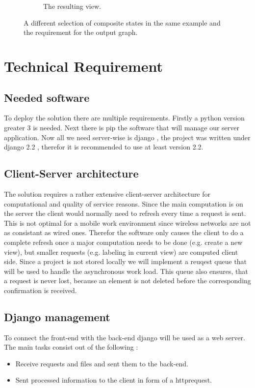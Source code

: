 \documentclass[12pt]{extarticle}
\begin{document}
\begin{figure}[H]
\begin{subfigure}[b]{0.45\textwidth}
        \caption{The resulting view.}
        \label{fig:view2}
    \end{subfigure}
    \caption{A different selection of composite states in the same example and the requirement for the output graph.}
    \label{fig:pandv}
\end{figure}

\section{Technical Requirement}

\subsection{Needed software}
To deploy the solution there are multiple requirements. Firstly a python version greater 3 is needed. Next there is pip the software that will manage our server application. Now all we need server-wise is django , the project was written under django 2.2 , therefor it is recommended to use at least version 2.2.

\subsection{Client-Server architecture}
The solution requires a rather extensive client-server architecture for computational and quality of service reasons. Since the main computation is on the server the client would normally need to refresh every time a request is sent. This is not optimal for a mobile work environment since wireless networks are not as consistant as wired ones. Therefor the software only causes the client to do a complete refresh once a major computation needs to be done (e.g. create a new view), but smaller requests (e.g. labeling in current view) are computed client side. Since a project is not stored locally we will implement a reuqest queue that will be used to handle the asynchronous work load. This queue also ensures, that a request is never lost, because an element is not deleted before the corresponding confirmation is received. 

\subsection{Django management}
To connect the front-end with the back-end django will be used as a web server. The main tasks consist out of the following :
\begin{itemize}
	\item Receive requests and files and sent them to the back-end.
	\item Sent processed information to the client in form of a httprequest.
\end{itemize}
\end{document}
